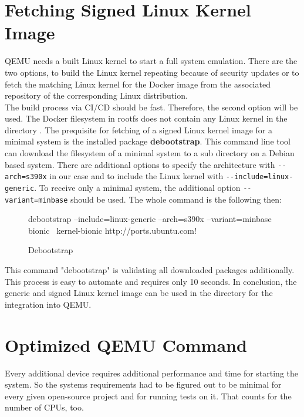 \section{Fetching Signed Linux Kernel Image} \label{LinuxKernel}

QEMU needs a built Linux kernel to start a full system emulation. There are the two options, to build the Linux kernel repeating because of security updates or to fetch the matching Linux kernel for the Docker image from the associated repository of the corresponding Linux distribution. \\ 
The build process via CI/CD should be fast. Therefore, the second option will be used. The Docker filesystem in rootfs does not contain any Linux kernel in the directory .
The prequisite for fetching of a signed Linux kernel image for a minimal system is the installed package \textbf{debootstrap}. This command line tool can download the filesystem of a minimal system to a sub directory on a Debian based system. There are additional options to specify the architecture with \lstinline!--arch=s390x! in our case and to include the Linux kernel with \lstinline!--include=linux-generic!. To receive only a minimal system, the additional option \lstinline!--variant=minbase! should be used. The whole command is the following then: \\
\begin{figure}[H]
\begin{boxedverbatim}
debootstrap --include=linux-generic --arch=s390x --variant=minbase bionic \
kernel-bionic http://ports.ubuntu.com! 
\end{boxedverbatim}
\caption{Debootstrap}
    \label{Debootstrap}
\end{figure}

This command "debootstrap" is validating all downloaded packages additionally. This process is easy to automate and requires only 10 seconds. In conclusion, the generic and signed Linux kernel image can be used in the  directory for the integration into QEMU.
 

\section{Optimized QEMU Command}\label{Optimized-Qemu-Command}

Every additional device requires additional performance and time for starting the system. 
So the systems requirements had to be figured out to be minimal for every given open-source project and for running tests on it. 
That counts for the number of CPUs, too. \\

